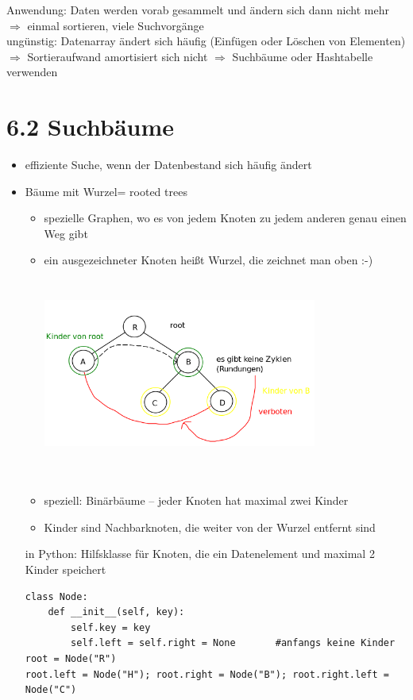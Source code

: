\documentclass[11pt, fleqn]{scrreprt}
\begin{document}
        Anwendung: Daten werden vorab gesammelt und ändern sich dann nicht mehr\\
        $\Rightarrow$ einmal sortieren, viele Suchvorgänge\\

        ungünstig: Datenarray ändert sich häufig (Einfügen oder Löschen von Elementen)\\
        $\Rightarrow$ Sortieraufwand amortisiert sich nicht $\Rightarrow$ Suchbäume oder Hashtabelle verwenden

        \section*{6.2 Suchbäume}

        \begin{itemize}
            \item effiziente Suche, wenn der Datenbestand sich häufig ändert
            \item \glqq Bäume mit Wurzel\grqq = rooted trees \\
            \begin{itemize}
                \item spezielle Graphen, wo es von jedem Knoten zu jedem anderen genau einen Weg gibt
                \item ein ausgezeichneter Knoten heißt \glqq Wurzel\grqq , die zeichnet man oben :-)\\
                \includegraphics[width=9cm,height=7cm,keepaspectratio]{./Pictures/binaerBaum.png}
                \item speziell: Binärbäume – jeder Knoten hat maximal zwei Kinder
                \item Kinder sind Nachbarknoten, die weiter von der Wurzel entfernt sind
            \end{itemize}
            in Python: Hilfsklasse für Knoten, die ein Datenelement und maximal 2 Kinder speichert

\begin{verbatim}
class Node:
    def __init__(self, key):
        self.key = key
        self.left = self.right = None       #anfangs keine Kinder
root = Node("R")
root.left = Node("H"); root.right = Node("B"); root.right.left = Node("C")
\end{verbatim}
        \end{itemize}
\end{document}
